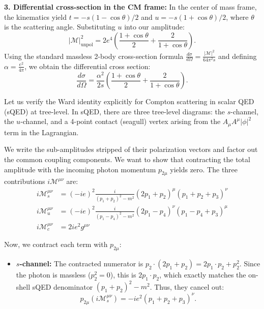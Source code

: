 \begin{example}[Compton Scattering in QED with $m_e = 0$]
    \textbf{3. Differential cross-section in the CM frame:}
    In the center of mass frame, the kinematics yield $t = -s(1-\cos\theta)/2$ and $u = -s(1+\cos\theta)/2$, where $\theta$ is the scattering angle. Substituting $u$ into our amplitude:
    \[
        \vert \mathcal{M} \vert^2_{\text{unpol}} = 2e^4 \left( \frac{1+\cos\theta}{2} + \frac{2}{1+\cos\theta} \right).
    \]
    Using the standard massless 2-body cross-section formula $\frac{d\sigma}{d\Omega} = \frac{\vert \mathcal{M} \vert^2}{64\pi^2 s}$ and defining $\alpha = \frac{e^2}{4\pi}$, we obtain the differential cross section:
    \[
        \frac{d\sigma}{d\Omega} = \frac{\alpha^2}{2s} \left( \frac{1+\cos\theta}{2} + \frac{2}{1+\cos\theta} \right).
    \]
\end{example}


\begin{example}
    Let us verify the Ward identity explicitly for Compton scattering in scalar QED (sQED) at tree-level. In sQED, there are three tree-level diagrams: the $s$-channel, the $u$-channel, and a 4-point contact (seagull) vertex arising from the $A_\mu A^\mu \vert \phi \vert^2$ term in the Lagrangian.

    We write the sub-amplitudes stripped of their polarization vectors and factor out the common coupling components. We want to show that contracting the total amplitude with the incoming photon momentum $p_{2\mu}$ yields zero. The three contributions $i\mathcal{M}^{\mu\nu}$ are:
    \begin{align*}
        i\mathcal{M}_s^{\mu\nu} & = (-ie)^2 \frac{i}{(p_1+p_2)^2 - m^2} (2p_1+p_2)^\mu (p_1+p_2+p_3)^\nu \\
        i\mathcal{M}_u^{\mu\nu} & = (-ie)^2 \frac{i}{(p_1-p_4)^2 - m^2} (2p_1-p_4)^\nu (p_1-p_4+p_3)^\mu \\
        i\mathcal{M}_c^{\mu\nu} & = 2ie^2 g^{\mu\nu}
    \end{align*}

    Now, we contract each term with $p_{2\mu}$:
    \begin{itemize}
        \item \textbf{$s$-channel:} The contracted numerator is $p_2 \cdot (2p_1+p_2) = 2p_1\cdot p_2 + p_2^2$. Since the photon is massless ($p_2^2 = 0$), this is $2p_1 \cdot p_2$, which exactly matches the on-shell sQED denominator $(p_1+p_2)^2 - m^2$. Thus, they cancel out:
              \[
                  p_{2\mu} (i\mathcal{M}_s^{\mu\nu}) = -ie^2 (p_1+p_2+p_3)^\nu.
              \]


\end{itemize}
\end{example}
